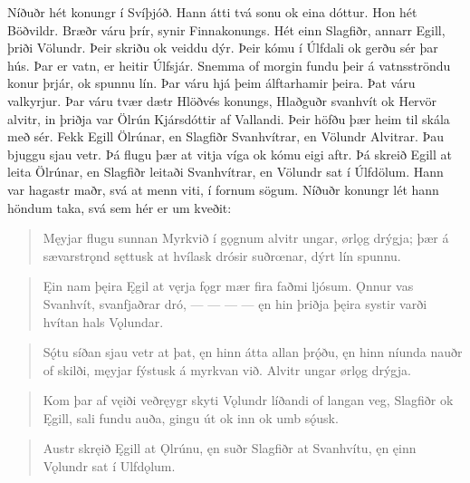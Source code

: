 Níðuðr hét konungr í Svíþjóð. Hann átti tvá sonu ok eina dóttur. Hon hét Böðvildr. Bræðr váru þrír, synir Finnakonungs. Hét einn Slagfiðr, annarr Egill, þriði Völundr. Þeir skriðu ok veiddu dýr. Þeir kómu í Úlfdali ok gerðu sér þar hús. Þar er vatn, er heitir Úlfsjár. Snemma of morgin fundu þeir á vatnsströndu konur þrjár, ok spunnu lín. Þar váru hjá þeim álftarhamir þeira. Þat váru valkyrjur. Þar váru tvær dætr Hlöðvés konungs, Hlaðguðr svanhvít ok Hervör alvitr, in þriðja var Ölrún Kjársdóttir af Vallandi. Þeir höfðu þær heim til skála með sér. Fekk Egill Ölrúnar, en Slagfiðr Svanhvítrar, en Völundr Alvitrar. Þau bjuggu sjau vetr. Þá flugu þær at vitja víga ok kómu eigi aftr. Þá skreið Egill at leita Ölrúnar, en Slagfiðr leitaði Svanhvítrar, en Völundr sat í Úlfdölum. Hann var hagastr maðr, svá at menn viti, í fornum sögum. Níðuðr konungr lét hann höndum taka, svá sem hér er um kveðit:\\%

\begin{verse}
\bva Męyjar flugu sunnan
Myrkvið í gǫgnum
alvitr ungar,
ørlǫg drýgja;
þær á sævarstrǫnd
sęttusk at hvílask
drósir suðrœnar,
dýrt lín spunnu.\\%
\end{verse}


\begin{verse}
\bva Ęin nam þęira
Ęgil at vęrja
fǫgr mær fira
faðmi ljósum.
Ǫnnur vas Svanhvít,
svanfjaðrar dró,
— — — —
ęn hin þriðja
þęira systir
varði hvítan
hals Vǫlundar.\\%
\end{verse}


\begin{verse}
\bva Sǫ́tu síðan
sjau vetr at þat,
ęn hinn átta
allan þrǫ́ðu,
ęn hinn níunda
nauðr of skilði,
męyjar fýstusk
á myrkvan við.
Alvitr ungar
ørlǫg drýgja.\\%
\end{verse}


\begin{verse}
\bva Kom þar af vęiði
veðręygr skyti
Vǫlundr líðandi
of langan veg,
Slagfiðr ok Ęgill,
sali fundu auða,
gingu út ok inn
ok umb sǫ́usk.\\%
\end{verse}


\begin{verse}
\bva Austr skręið Ęgill
at Ǫlrúnu,
ęn suðr Slagfiðr
at Svanhvítu,
ęn ęinn Vǫlundr
sat í Ulfdǫlum.\\%
\end{verse}


